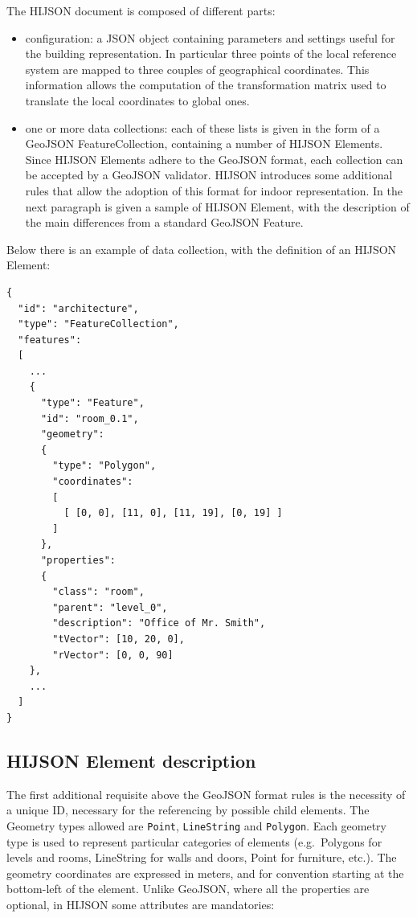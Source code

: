 \documentclass{sig-alternate}
\begin{document}
The HIJSON document is composed of different parts:

\begin{itemize}
\itemsep1pt\parskip0pt
\item  
  configuration: a JSON object containing parameters and settings useful
  for the building representation. In particular three points of the local
  reference system are mapped to three couples of geographical coordinates.
  This information allows the computation of the transformation matrix used to
  translate the local coordinates to global ones.
\item
  one or more data collections: each of these lists is given in the form   of
  a GeoJSON FeatureCollection, containing a number of HIJSON   Elements. Since
  HIJSON Elements adhere to the GeoJSON format, each   collection can be
  accepted by a GeoJSON validator. HIJSON introduces   some additional rules
  that allow the adoption of this format for   indoor representation. In the
  next paragraph is given a sample of HIJSON Element, with   the description of
  the main differences from a standard GeoJSON   Feature. 
\end{itemize}

Below there is an example of data collection, with the definition of an HIJSON Element:

\begin{verbatim}
{
  "id": "architecture",
  "type": "FeatureCollection",
  "features": 
  [
    ...
    {
      "type": "Feature",
      "id": "room_0.1",
      "geometry": 
      {
        "type": "Polygon",
        "coordinates": 
        [ 
          [ [0, 0], [11, 0], [11, 19], [0, 19] ]
        ]
      },
      "properties": 
      {
        "class": "room",
        "parent": "level_0",
        "description": "Office of Mr. Smith",
        "tVector": [10, 20, 0],
        "rVector": [0, 0, 90]
    },
    ...
  ]
}
\end{verbatim}

\subsection{HIJSON Element description}

The first additional requisite above the GeoJSON format rules is the
necessity of a unique ID, necessary for the referencing by possible
child elements. The Geometry types allowed are \texttt{Point},
\texttt{LineString} and \texttt{Polygon}. Each geometry type is used to
represent particular categories of elements (e.g.~Polygons for levels
and rooms, LineString for walls and doors, Point for furniture, etc.).
The geometry coordinates are expressed in meters, and for convention
starting at the bottom-left of the element. Unlike GeoJSON, where all
the properties are optional, in HIJSON some attributes are mandatories:
\end{document}
